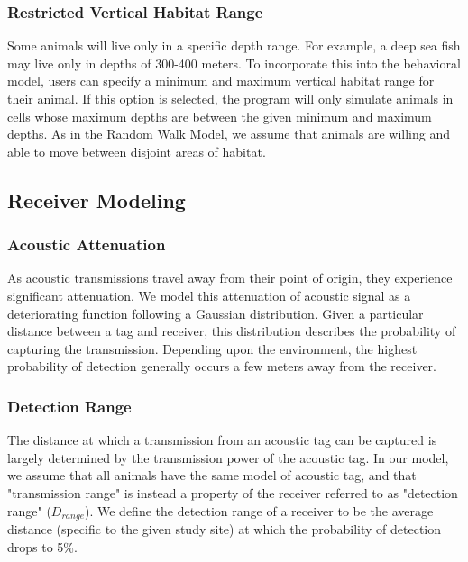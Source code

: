 \subsubsection{Restricted Vertical Habitat Range}
\label{restrictedVerticalHabitat}
Some animals will live only in a specific depth range.  For example, a deep sea fish may live only in depths of 300-400 meters.  To incorporate this into the behavioral model, users can specify a minimum and maximum vertical habitat range for their animal.  If this option is selected, the program will only simulate animals in cells whose maximum depths are between the given minimum and maximum depths.  As in the Random Walk Model, we assume that animals are willing and able to move between disjoint areas of habitat.


\subsection{Receiver Modeling}
\label{receiverModel}

\subsubsection{Acoustic Attenuation}
\label{acousticAttenuation}
As acoustic transmissions travel away from their point of origin, they experience significant attenuation.  We model this attenuation of acoustic signal as a deteriorating function following a Gaussian distribution.  Given a particular distance between a tag and receiver, this distribution describes the probability of capturing the transmission.  Depending upon the environment, the highest probability of detection generally occurs a few meters away from the receiver.

\subsubsection{Detection Range}
\label{detectionRange}
The distance at which a transmission from an acoustic tag can be captured is largely determined by the transmission power of the acoustic tag.  In our model, we assume that all animals have the same model of acoustic tag, and that "transmission range" is instead a property of the receiver referred to as "detection range" ($D_{range}$).  We define the detection range of a receiver to be the average distance (specific to the given study site) at which the probability of detection drops to 5\%.

